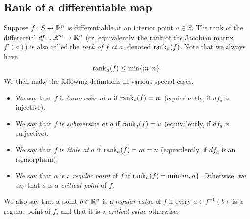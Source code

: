 \subsection{Rank of a differentiable map}

\begin{definition} \label{immersive-submersive-critical} 
	Suppose $f : S \to \mathbb{R}^n$ is differentiable at an interior point $a \in S$. The rank of the differential $df_a : \mathbb{R}^m \to \mathbb{R}^n$ (or, equivalently, the rank of the Jacobian matrix $f'(a)$) is also called the \emph{rank of $f$ at $a$}, denoted $\operatorname{rank}_a(f)$. Note that we always have \[ \operatorname{rank}_a(f) \leq \min\{m,n\}. \]
	We then make the following definitions in various special cases. 
	\begin{itemize}
		\item We say that $f$ is \emph{immersive at $a$} if $\operatorname{rank}_a(f) = m$ (equivalently, if $df_a$ is injective). 
		\item We say that $f$ is \emph{submersive at $a$} if $\operatorname{rank}_a(f) = n$ (equivalently, if $df_a$ is surjective). 
		\item We say that $f$ is \emph{\'etale at $a$} if $\operatorname{rank}_a(f) = m = n$ (equivalently, if $df_a$ is an isomorphism). 
		\item We say that $a$ is a \emph{regular point} of $f$ if $\operatorname{rank}_a(f) = \min\{m,n\}$. Otherwise, we say that $a$ is a \emph{critical point} of $f$.
	\end{itemize}
	We also say that a point $b \in \mathbb{R}^n$ is a \emph{regular value} of $f$ if every $a \in f^{-1}(b)$ is a regular point of $f$, and that it is a \emph{critical value} otherwise. 
\end{definition}

